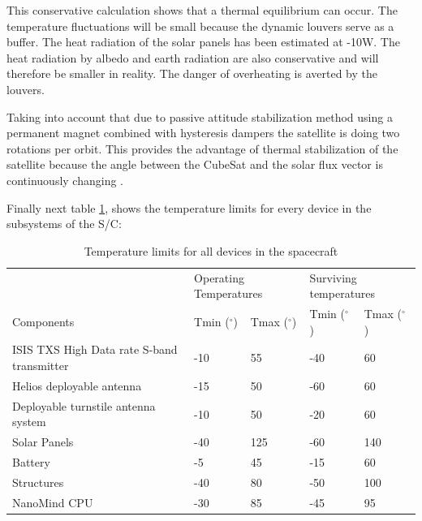 This conservative calculation shows that a thermal equilibrium can occur.
The temperature fluctuations will be small because the dynamic louvers serve
as a buffer. The heat radiation of the solar panels has been estimated at -10W.
The heat radiation by albedo and earth radiation are also conservative and will
therefore be smaller in reality. The danger of overheating is averted by the
louvers.

Taking into account that due to passive attitude stabilization method using a
permanent magnet combined with hysteresis dampers the satellite is doing two
rotations per orbit. This provides the advantage of thermal stabilization of the
satellite because the angle between the CubeSat and the solar flux vector is
continuously changing \cite{wiki_thermal}.

Finally next table \ref{tab:temp_limit}, shows the temperature limits for every device in the subsystems
of the S/C:

\begin{table}[]
	\begin{tabular}{lllll}
		\hline
		& \multicolumn{2}{l}{Operating Temperatures} & \multicolumn{2}{l}{Surviving temperatures} \\
		Components                                 & Tmin ($^\circ$)& Tmax ($^\circ$)& Tmin ($^\circ$)& Tmax ($^\circ$)  \\ \hline
		ISIS TXS High Data rate S-band transmitter & -10                  & 55                  & -40                  & 60                  \\
		Helios deployable antenna                  & -15                  & 50                  & -60                  & 60                  \\
		Deployable turnstile antenna system        & -10                  & 50                  & -20                  & 60                  \\
		Solar Panels                               & -40                  & 125                 & -60                  & 140                 \\
		Battery                                    & -5                   & 45                  & -15                  & 60                  \\
		Structures                                 & -40                  & 80                  & -50                  & 100                 \\
		NanoMind CPU                               & -30                  & 85                  & -45                  & 95 \\ \hline
	\end{tabular}
	\caption{Temperature limits for all devices in the spacecraft}
	\label{tab:temp_limit}
\end{table}
